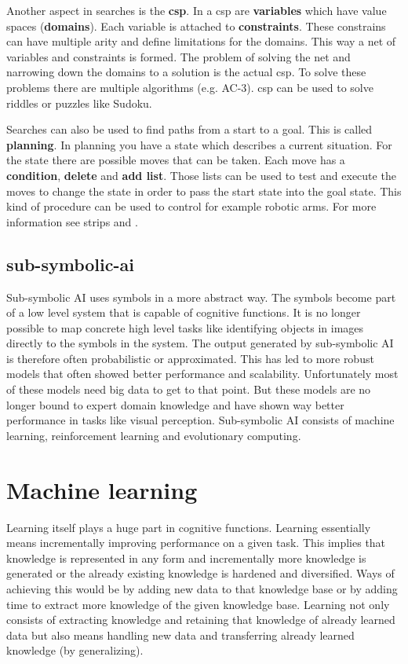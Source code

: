 \documentclass[jou,apacite]{apa6}
\begin{document}
Another aspect in searches is the \textbf{\gls{csp}}. In a \gls{csp} are \textbf{variables} which have value spaces (\textbf{domains}). Each variable is attached to \textbf{constraints}. These constrains can have multiple arity and define limitations for the domains. 
This way a net of variables and constraints is formed. The problem of solving the net and narrowing down the domains to a solution is the actual \gls{csp}. To solve these problems there are multiple algorithms (e.g. AC-3). \gls{csp} can be used to solve riddles or puzzles like Sudoku.

Searches can also be used to find paths from a start to a goal. This is called \textbf{planning}. In planning you have a state which describes a current situation. For the state there are possible moves that can be taken. Each move has a \textbf{condition}, \textbf{delete} and \textbf{add list}. Those lists can be used to test and execute the moves to change the state in order to pass the start state into the goal state. This kind of procedure can be used to control for example robotic arms. For more information see \gls{strips} and \cite{Nilsson1982}.

\subsection{\gls{sub-symbolic-ai}}
Sub-symbolic AI uses symbols in a more abstract way. The symbols become part of a low level system that is capable of cognitive functions. It is no longer possible to map concrete high level tasks like identifying objects in images directly to the symbols in the system. The output generated by sub-symbolic AI is therefore often probabilistic or approximated. This has led to more robust models that often showed better performance and scalability. Unfortunately most of these models need big data to get to that point. But these models are no longer bound to expert domain knowledge and have shown way better performance in tasks like visual perception. Sub-symbolic AI consists of machine learning, reinforcement learning and evolutionary computing.

\section{Machine learning}
Learning itself plays a huge part in cognitive functions. Learning essentially means incrementally improving performance on a given task. This implies that knowledge is represented in any form and incrementally more knowledge is generated or the already existing knowledge is hardened and diversified. Ways of achieving this would be by adding new data to that knowledge base or by adding time to extract more knowledge of the given knowledge base. Learning not only consists of extracting knowledge and retaining that knowledge of already learned data but also means handling new data and transferring already learned knowledge (by generalizing).
\end{document}
